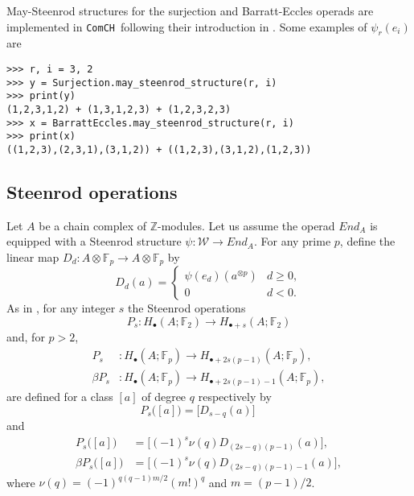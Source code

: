 \documentclass{amsart}
\newcommand{\comch}{\texttt{ComCH}}
\begin{document}
May-Steenrod structures for the surjection and Barratt-Eccles operads are implemented in \comch\, following their introduction in \cite{medina2020chain}. Some examples of $\psi_r(e_i)$ are

\begin{Verbatim}[frame=single, samepage=true]
>>> r, i = 3, 2
>>> y = Surjection.may_steenrod_structure(r, i)
>>> print(y)
(1,2,3,1,2) + (1,3,1,2,3) + (1,2,3,2,3)
>>> x = BarrattEccles.may_steenrod_structure(r, i)
>>> print(x)
((1,2,3),(2,3,1),(3,1,2)) + ((1,2,3),(3,1,2),(1,2,3))
\end{Verbatim}

\subsection{Steenrod operations}

Let $A$ be a chain complex of $\mathbb Z$-modules. Let us assume the operad $End_A$ is equipped with a Steenrod structure $\psi \colon \mathcal W \to End_A$. For any prime $p$, define the linear map $D_d \colon A \otimes \mathbb F_p \to A \otimes \mathbb F_p$ by
\begin{equation*}
D_d(a) = \begin{cases}
\psi(e_d)(a^{\otimes p}) & d \geq 0, \\
0 & d < 0.
\end{cases}
\end{equation*}
As in \cite{May70algebraic}, for any integer $s$ the Steenrod operations
\begin{equation*}
P_s : H_\bullet(A; \mathbb F_2) \to H_{\bullet + s}(A; \mathbb F_2)
\end{equation*}
and, for $p > 2$,
\begin{align*}
P_s & \colon H_\bullet(A; \mathbb F_p) \to H_{\bullet + 2s(p-1)}(A; \mathbb F_p), \\
\beta P_s & \colon H_\bullet(A; \mathbb F_p) \to H_{\bullet + 2s(p-1) - 1}(A; \mathbb F_p),
\end{align*}
are defined for a class $[a]$ of degree $q$ respectively by
\begin{equation*}
P_s\big([a]\big) = \big[D_{s-q}(a)\big] \qquad
\end{equation*}
and
\begin{align*}
P_s\big([a]\big) & = \big[(-1)^s \nu(q) D_{(2s-q)(p-1)}(a)\big], \\
\beta P_s\big([a]\big) & = \big[(-1)^s \nu(q)D_{(2s-q)(p-1)-1}(a)\big],
\end{align*}
where $\nu(q) = (-1)^{q(q-1)m/2}(m!)^q$ and $m = (p-1)/2$.
\end{document}
